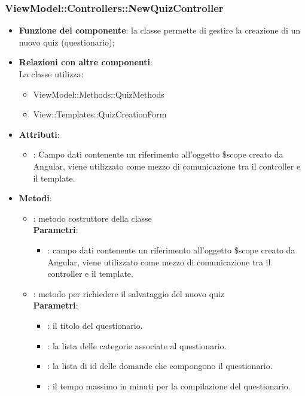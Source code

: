 \subsubsection{ViewModel::Controllers::NewQuizController}
\begin{itemize}
\item\textbf{Funzione del componente}: la classe permette di gestire la creazione di un nuovo quiz (questionario);
\item\textbf{Relazioni con altre componenti}: \\
La classe utilizza:
	\begin{itemize}
		\item ViewModel::Methods::QuizMethods
		\item View::Templates::QuizCreationForm
	\end{itemize}
\item\textbf{Attributi}:
	\begin{itemize}
		\item{}: Campo dati contenente un riferimento all'oggetto \$scope creato da Angular, viene utilizzato come mezzo di comunicazione tra il controller e il template.\\
	\end{itemize}
\item\textbf{Metodi}:
	\begin{itemize}
		\item{}: metodo costruttore della classe\\
		\textbf{Parametri}:
			\begin{itemize}
				\item{}: campo dati contenente un riferimento all’oggetto \$scope creato da Angular, viene utilizzato come mezzo di comunicazione tra il controller e il template.\\
			\end{itemize}
		\item{}: metodo per richiedere il salvataggio del nuovo quiz\\
		\textbf{Parametri}:
			\begin{itemize}
				\item{}: il titolo del questionario.\\
				\item{}: la lista delle categorie associate al questionario.\\
				\item{}: la lista di id delle domande che compongono il questionario.\\
				\item{}: il tempo massimo in minuti per la compilazione del questionario.\\
			\end{itemize}
	\end{itemize}
\end{itemize}

